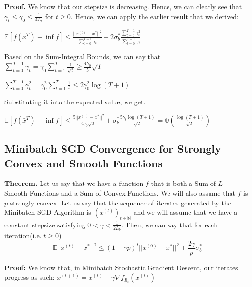 \noindent \textbf{Proof.} We know that our stepsize is decreasing. Hence, we can clearly see that $\gamma_t \leq \gamma_0 \leq \frac{1}{4L_{b}}$ for $t \geq 0$. Hence, we can apply the earlier result that we derived: \newline 

$\mathbb{E}[f(\bar{x}^T) - \inf f] \leq \frac{||x^{(0)} - x^*||^2}{\sum_{t = 0}^{T - 1} \gamma_t} + 2\sigma_b^* \frac{\sum_{t = 0}^{T - 1} \gamma_t^2}{\sum_{t = 0}^{T - 1} \gamma_t}$ \newline 

Based on the Sum-Integral Bounds, we can say that $\sum_{t = 0}^{T - 1} \gamma_t = \gamma_0 \sum_{t = 1}^{T} \frac{1}{\sqrt{t}} \geq \frac{4\gamma_0}{5} \sqrt{T}$ \newline 

$\sum_{t = 0}^{T - 1} \gamma_t^2 = \gamma_0^2 \sum_{t = 1}^{T} \frac{1}{t} \leq 2 \gamma_0^2 \log(T + 1)$ \newline

Substituting it into the expected value, we get: \newline 

$\mathbb{E}[f(\bar{x}^T) - \inf f] \leq \frac{5 ||x^{(0)} - x^*||^2}{4 \gamma_0 \sqrt{T}} + \sigma_b^* \frac{5 \gamma_0 \log{(T + 1)}}{\sqrt{T}} = \mathbb{O}(\frac{\log{(T + 1)}}{\sqrt{T}})$ \newline 

\subsection{Minibatch SGD Convergence for Strongly Convex and Smooth Functions}
\noindent \textbf{Theorem.} Let us say that we have a function $f$ that is both a Sum of $L-$Smooth Functions and a Sum of Convex Functions. We will also assume that $f$ is $p$ strongly convex. Let us say that the sequence of iterates generated by the Minibatch SGD Algorithm is $(x^{(t)})_{t \in \mathbb{N}}$ and we will assume that we have a constant stepsize satisfying $0 < \gamma < \frac{1}{2L_{b}}$. Then, we can say that for each iteration(i.e. $t \geq 0$) 
\begin{equation}
    \mathbb{E}||x^{(t)} - x^*||^2 \leq (1 - \gamma p)^t ||x^{(0)} - x^*||^2 + \frac{2 \gamma}{p} \sigma_b^*
\end{equation}

\noindent \textbf{Proof:} \newline 
We know that, in Minibatch Stochastic Gradient Descent, our iterates progress as such: $x^{(t + 1)}  = x^{(t)} - \gamma \nabla f_{B_t}(x^{(t)})$ \newline 

